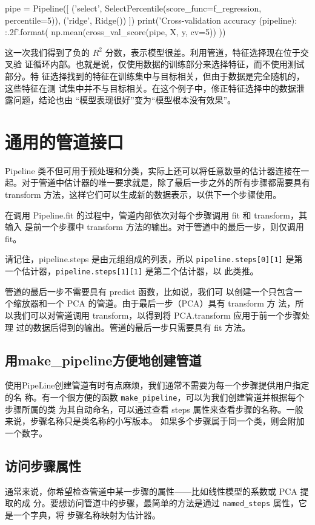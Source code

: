 \begin{tcolorbox}[title=举例说明信息泄露]
    \begin{pyc}
        pipe = Pipeline([
                ('select', SelectPercentile(score_func=f_regression, percentile=5)),
                ('ridge', Ridge())
            ])
        print('Cross-validation accuracy (pipeline): {:.2f}'.format(
        np.mean(cross_val_score(pipe, X, y, cv=5))
        ))
    \end{pyc}
    这一次我们得到了负的 $R^2$ 分数，表示模型很差。利用管道，特征选择现在位于交叉验
    证循环内部。也就是说，仅使用数据的训练部分来选择特征，而不使用测试部分。特
    征选择找到的特征在训练集中与目标相关，但由于数据是完全随机的，这些特征在测
    试集中并不与目标相关。在这个例子中，修正特征选择中的数据泄露问题，结论也由
    “模型表现很好”变为“模型根本没有效果”。
\end{tcolorbox}
\section{通用的管道接口}
Pipeline 类不但可用于预处理和分类，实际上还可以将任意数量的估计器连接在一起。对于管道中估计器的唯一要求就是，除了最后一步之外的所有步骤都需要具有 transform
方法，这样它们可以生成新的数据表示，以供下一个步骤使用。

在调用 Pipeline.fit 的过程中，管道内部依次对每个步骤调用 fit 和 transform，其输入
是前一个步骤中 transform 方法的输出。对于管道中的最后一步，则仅调用 fit。

请记住，pipeline.steps 是由元组组成的列表，所以 \verb|pipeline.steps[0][1]| 是第一个估计器，\verb|pipeline.steps[1][1]| 是第二个估计器，以
此类推。

管道的最后一步不需要具有 predict 函数，比如说，我们可
以创建一个只包含一个缩放器和一个 PCA 的管道。由于最后一步（PCA）具有 transform 方
法，所以我们可以对管道调用 transform，以得到将 PCA.transform 应用于前一个步骤处理
过的数据后得到的输出。管道的最后一步只需要具有 fit 方法。
\subsection{用make\_pipeline方便地创建管道}
使用PipeLine创建管道有时有点麻烦，我们通常不需要为每一个步骤提供用户指定的名
称。有一个很方便的函数 \verb|make_pipeline|，可以为我们创建管道并根据每个步骤所属的类
为其自动命名，可以通过查看 steps 属性来查看步骤的名称。一般来说，步骤名称只是类名称的小写版本。
如果多个步骤属于同一个类，则会附加一个数字。
\subsection{访问步骤属性}
通常来说，你希望检查管道中某一步骤的属性——比如线性模型的系数或 PCA 提取的成
分。要想访问管道中的步骤，最简单的方法是通过 \verb|named_steps| 属性，它是一个字典，将
步骤名称映射为估计器。
